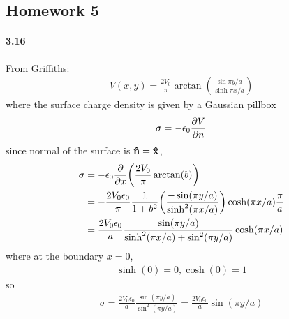 \documentclass[../main.tex]{subfiles}
\begin{document}
\pagestyle{fancy}

\begin{center}
\section*{Homework 5}
\end{center}
\paragraph{3.16} 

From Griffiths:
\begin{align*}
    V(x,y) = \frac{2V_0}{\pi} \arctan(\frac{\sin\pi y/a}{\sinh\pi x/a})
\end{align*}
where the surface charge density is given by a Gaussian pillbox
\begin{align*}
    \sigma = -\epsilon_0 \pdv{V}{n}
\end{align*}
since normal of the surface is $\vu{n} = \vu{x}$,
\begin{align*}
    \sigma &= -\epsilon_0 \pdv{x} \qt(
        \frac{2V_0}{\pi} \arctan(b)
    ) \\
    &= -\frac{2V_0 \epsilon_0}{\pi} \frac{1}{1 + b^2} \qt(\frac{-\sin(\pi y/a)}{\sinh^2(\pi x/a)}) \cosh(\pi x/a) \frac{\pi}{a} \\
    &= \frac{2V_0 \epsilon_0}{a} \frac{\sin(\pi y/a)}{\sinh^2(\pi x/a) + \sin^2(\pi y/a)} \cosh(\pi x/a)
\end{align*}
where at the boundary $x = 0$,
\begin{align*}
    \sinh(0) = 0, \cosh(0) = 1
\end{align*}
so 
\begin{align*}
    \sigma = \frac{2V_0 \epsilon_0}{a} \frac{\sin(\pi y/a)}{\sin^2(\pi y/a)} = \boxed{\frac{2V_0 \epsilon_0}{a} \sin(\pi y/a)}
\end{align*}

\newpage
\end{document}
